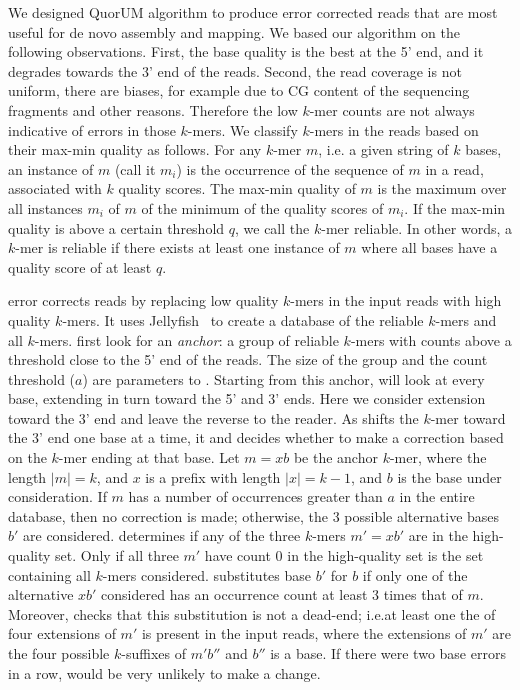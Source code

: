\documentclass[10pt]{bmc_article}
\newenvironment{bmcformat}{\fussy\setboolean{publ}{true}}{\fussy}
\begin{document}
\begin{bmcformat}
We designed QuorUM algorithm to produce error corrected reads that are most useful for de novo assembly and mapping.
We based our algorithm on the following observations.
First, the base quality is the best at the 5' end, and it degrades towards the 3' end of the reads.
Second, the read coverage is not uniform, there are biases, for example due to CG content of the sequencing fragments and other reasons.
Therefore the low $k$-mer counts are not always indicative of errors in those $k$-mers.
We classify $k$-mers in the reads based on their max-min quality as follows.
For any $k$-mer $m$, i.e. a given string of $k$ bases, an instance of $m$ (call it $m_i$) is the occurrence of the sequence of $m$ in a read, associated with $k$ quality scores.
The max-min quality of $m$ is the maximum over all instances $m_i$ of $m$ of the minimum of the quality scores of $m_i$.
If the max-min quality is above a certain threshold $q$, we call the $k$-mer reliable.
In other words, a $k$-mer is reliable if there exists at least one instance of $m$ where all bases have a quality score of at least $q$.

\quorum error corrects reads by replacing low quality $k$-mers in the input reads with high quality $k$-mers.
It uses Jellyfish~\cite{Marcais2011} to create a database of the reliable $k$-mers and all $k$-mers.
\quorum first look for an \emph{anchor}: a group of reliable $k$-mers with counts above a threshold close to the 5' end of the reads.
The size of the group and the count threshold ($a$) are parameters to \quorum.
Starting from this anchor, \quorum will look at every base, extending in turn toward the 5' and 3' ends.
Here we consider extension toward the 3' end and leave the reverse to the reader.
As \quorum shifts the $k$-mer toward the 3' end one base at a time, it and decides whether to make a correction based on the $k$-mer ending at that base.
Let $m = xb$ be the anchor $k$-mer, where the length $|m| = k$, and $x$ is a prefix with length $|x| = k - 1$, and $b$ is the base under consideration.
If $m$ has a number of occurrences greater than $a$ in the entire database, then no correction is made; otherwise, the 3 possible alternative bases $b'$ are considered.
\quorum determines if any of the three $k$-mers $m' = xb'$ are in the high-quality set.
Only if all three $m'$ have count 0 in the high-quality set is the set containing all $k$-mers considered.
\quorum substitutes base $b'$ for $b$ if only one of the alternative $xb'$ considered has an occurrence count at least 3 times that of $m$.
Moreover, \quorum checks that this substitution is not a dead-end; i.e.\@ at least one the of four extensions of $m'$ is present in the input reads, where the extensions of $m'$ are the four possible $k$-suffixes of $m'b''$ and $b''$ is a base.
If there were two base errors in a row, \quorum would be very unlikely to make a change. 


\end{bmcformat}
\end{document}

